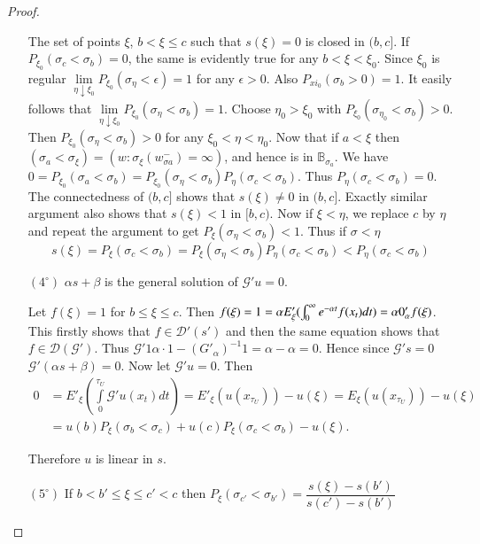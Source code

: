 \begin{proof}
\begin{itemize}
The set of points $\xi$, $b< \xi \leq c$ such that $s (\xi) =0$ is
closed in $(b,c]$. If $P_{\xi_0} (\sigma_c < \sigma_b) = 0$, the same
    is evidently true for any $b < \xi < \xi_0$. Since $\xi_0$ is
    regular $\lim\limits_{\eta\downarrow\xi_0} P_{\xi_0} (\sigma_\eta
    < \epsilon) = 1$ for any $\epsilon > 0$. Also $P_{xi_0} (\sigma_b >
    0)=1$. It easily follows that $\lim\limits_{\eta \downarrow \xi
      _0} P_{\xi_0} (\sigma_\eta < \sigma _b) = 1$. Choose $\eta _0 >
    \xi _0$ with $P_{\xi_0} (\sigma_{\eta_0}< \sigma_b)> 0$. Then
    $P_{\xi_0} (\sigma_\eta < \sigma _b)> 0$ for any $\xi_0 < \eta <
    \eta_0$. Now that if $a < \xi$ then\pageoriginale 
    $(\sigma _a < \sigma_\xi) =
    (w:\sigma_\xi(w^-_{\sigma a})=\infty)$, and hence is in
    $\mathbb{B}_{\sigma_a}$. 
    We have $0=P_{\xi_0} (\sigma_a <
    \sigma_b) = P_{\xi_0} (\sigma_\eta < \sigma_b ) P_\eta (\sigma_c
    < \sigma_b)$. Thus $P_\eta (\sigma_c< \sigma_b) =0$. The
    connectedness of $(b,c]$ shows that $s(\xi)\neq 0$ in
    $(b,c]$. Exactly similar argument also shows that $s(\xi) < 1$ in
    $[b,c)$. Now if $\xi < \eta$, we replace $c$ by $\eta$ and repeat the
  argument to get $P_\xi (\sigma_\eta < \sigma_b)<1$. Thus if $\sigma
  < \eta$ 
$$
s(\xi) = P_\xi (\sigma_c < \sigma_b)= P_\xi (\sigma_\eta < \sigma_b)
P_\eta (\sigma_c < \sigma_b) < P_\eta (\sigma_c < \sigma_b) 
$$

\item[$(4^{\circ})$] $\alpha s+ \beta$ is the general solution of
  $\mathscr{G}'u =0$. 

Let $f(\xi) =1$ for $b\leq \xi \leq c$. Then $f(\xi)=1= \alpha E'_\xi
(\int^{\infty}_{0} e^{-\alpha t} f(x_t) dt)\break = \alpha 0'_\alpha
f(\xi)$. This firstly shows that $f \in\mathscr{D}' (s')$ and then the
same equation shows that $f \in\mathscr{D (\mathscr{G}')}$. Thus
$\mathscr{G}'1 \alpha \cdot 1-(G'_\alpha)^{-1} 1 = \alpha - \alpha =
0$. Hence since $\mathscr{G}' s= 0$ $\mathscr{G}' (\alpha s +
\beta)=0$. Now let $\mathscr{G}'u=0$. Then 
\begin{align*}
  0 & =E'_\xi
  \left(\int\limits^{\tau _{U}}_0 \mathscr{G}' u (x_t) dt\right)= E'_\xi (u
  (x_{\tau_U})) - u (\xi) = E_\xi (u(x_{\tau_U})) - u (\xi)\\
  & = u (b) P_\xi (\sigma_b< \sigma_c) + u (c) P_\xi (\sigma_c
  < \sigma_b) - u (\xi). 
\end{align*}

Therefore $u$ is linear in $s$.

\item[$(5^\circ)$] If $b < b' \leq \xi \leq c' < c$ then $P_\xi (\sigma_{c'} <
\sigma _{b'}) = \dfrac{s (\xi) - s (b')}{s(c') -s (b')}$  


\end{itemize}
\end{proof}
